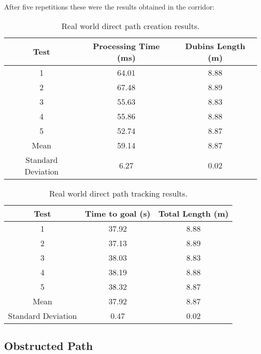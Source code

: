 After five repetitions these were the results obtained in the corridor:
\begin{table}[H]
    \centering
    \caption{Real world direct path creation results.}
    \begin{tabular}{|c|c|c|}
        \hline
        \textbf{Test} & \textbf{Processing Time (ms)} & \textbf{Dubins Length (m)} \\
        \hline
         1 & 64.01 & 8.88  \\
        \hline
         2 & 67.48 & 8.89 \\
         \hline
         3 & 55.63 & 8.83 \\
         \hline
         4 & 55.86 & 8.88 \\
         \hline
         5 & 52.74 & 8.87 \\
         \hline
         Mean & 59.14 & 8.87 \\
         \hline
        Standard Deviation & 6.27 & 0.02 \\
        \hline
    \end{tabular}
    \label{tab:direct_path_results3}
    
\end{table}
\begin{table}[H]
    \centering
    \caption{Real world direct path tracking results.}
    \begin{tabular}{|c|c|c|}
        \hline
        \textbf{Test} & \textbf{Time to goal (s)} & \textbf{Total Length (m)} \\
        \hline
        1 & 37.92 & 8.88 \\
        \hline
        2 & 37.13 & 8.89 \\
         \hline
         3 & 38.03 & 8.83 \\
         \hline
         4 & 38.19 & 8.88 \\
         \hline
         5 & 38.32 & 8.87 \\
         \hline
        Mean & 37.92 & 8.87 \\
        \hline
        Standard Deviation & 0.47 & 0.02 \\
        \hline
    \end{tabular}
    \label{tab:direct_path_results4}
\end{table}

\clearpage

\subsection{Obstructed Path}
\label{subsec:obstructed_path}
